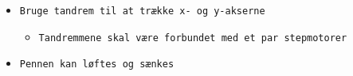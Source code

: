 \begin{itemize}
{    
    \label{fig:plotterskitse}
  }
\item \texttt{Bruge tandrem til at trække x- og y-akserne}
  \begin{itemize}
  \item \texttt{Tandremmene skal være forbundet med et par stepmotorer}
  \end{itemize}
\item \texttt{Pennen kan løftes og sænkes}
\end{itemize}

